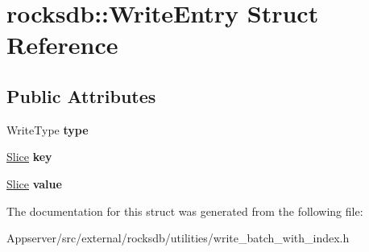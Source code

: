 \hypertarget{structrocksdb_1_1WriteEntry}{}\section{rocksdb\+:\+:Write\+Entry Struct Reference}
\label{structrocksdb_1_1WriteEntry}
\subsection*{Public Attributes}
\begin{DoxyCompactItemize}
\item 
Write\+Type {\bfseries type}\hypertarget{structrocksdb_1_1WriteEntry_a8ebe2ada239705f0485c5f8c2b817e02}{}\label{structrocksdb_1_1WriteEntry_a8ebe2ada239705f0485c5f8c2b817e02}

\item 
\hyperlink{classrocksdb_1_1Slice}{Slice} {\bfseries key}\hypertarget{structrocksdb_1_1WriteEntry_a7712a4980d989bf5f683fd5f77d5c4bf}{}\label{structrocksdb_1_1WriteEntry_a7712a4980d989bf5f683fd5f77d5c4bf}

\item 
\hyperlink{classrocksdb_1_1Slice}{Slice} {\bfseries value}\hypertarget{structrocksdb_1_1WriteEntry_a98d5a1c10d618684a35f66e485b7ea5f}{}\label{structrocksdb_1_1WriteEntry_a98d5a1c10d618684a35f66e485b7ea5f}

\end{DoxyCompactItemize}


The documentation for this struct was generated from the following file\+:\begin{DoxyCompactItemize}
\item 
Appserver/src/external/rocksdb/utilities/write\+\_\+batch\+\_\+with\+\_\+index.\+h\end{DoxyCompactItemize}
